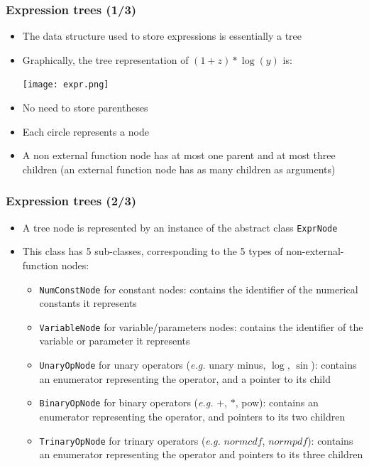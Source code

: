 \documentclass{beamer}
\begin{document}
\begin{frame}
  \frametitle{Expression trees (1/3)}
  \begin{itemize}
  \item The data structure used to store expressions is essentially a \alert{tree}
  \item Graphically, the tree representation of $(1+z)*\log(y)$ is:
    \begin{center}
      \texttt{[image: expr.png]}
    \end{center}
  \item No need to store parentheses
  \item Each circle represents a \alert{node}
  \item A non external function node has at most one parent and at most three children (an external function node has as many children as arguments)
  \end{itemize}
\end{frame}

\begin{frame}
  \frametitle{Expression trees (2/3)}
  \begin{itemize}
  \item A tree node is represented by an instance of the abstract class \texttt{ExprNode}
  \item This class has 5 sub-classes, corresponding to the 5 types of non-external-function nodes:
    \begin{itemize}
    \item \texttt{NumConstNode} for constant nodes: contains the identifier of the numerical constants it represents
    \item \texttt{VariableNode} for variable/parameters nodes: contains the identifier of the variable or parameter it represents
    \item \texttt{UnaryOpNode} for unary operators (\textit{e.g.} unary minus, $\log$, $\sin$): contains an enumerator representing the operator, and a pointer to its child
    \item \texttt{BinaryOpNode} for binary operators (\textit{e.g.} $+$, $*$, pow): contains an enumerator representing the operator, and pointers to its two children
    \item \texttt{TrinaryOpNode} for trinary operators (\textit{e.g.} $normcdf$, $normpdf$): contains an enumerator representing the operator and pointers to its three children
    \end{itemize}
  \end{itemize}
\end{frame}
\end{document}
